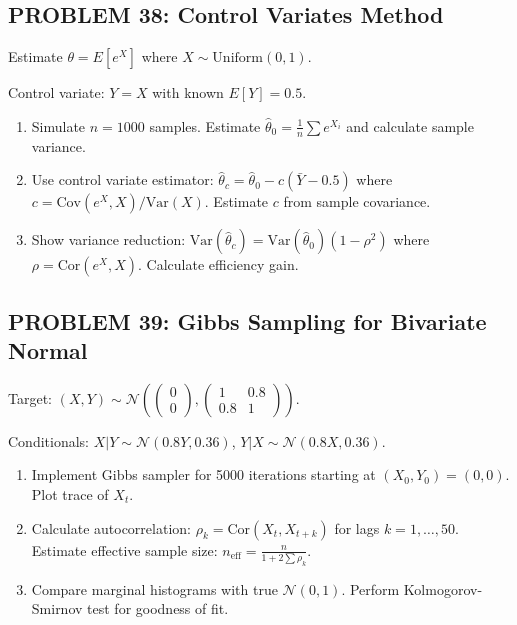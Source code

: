 \documentclass[12pt]{article}
\begin{document}
\subsection*{PROBLEM 38: Control Variates Method}

Estimate \(\theta = E[e^X]\) where \(X \sim \text{Uniform}(0,1)\).

Control variate: \(Y = X\) with known \(E[Y] = 0.5\).

\begin{enumerate}
\item[(a)] Simulate \(n=1000\) samples. Estimate \(\hat{\theta}_0 = \frac{1}{n}\sum e^{X_i}\) and calculate sample variance.
\item[(b)] Use control variate estimator: \(\hat{\theta}_c = \hat{\theta}_0 - c(\bar{Y} - 0.5)\) where \(c = \text{Cov}(e^X, X)/\text{Var}(X)\). Estimate \(c\) from sample covariance.
\item[(c)] Show variance reduction: \(\text{Var}(\hat{\theta}_c) = \text{Var}(\hat{\theta}_0)(1 - \rho^2)\) where \(\rho = \text{Cor}(e^X, X)\). Calculate efficiency gain.
\end{enumerate}

\subsection*{PROBLEM 39: Gibbs Sampling for Bivariate Normal}

Target: \((X,Y) \sim \mathcal{N}\left(\begin{pmatrix}0\\0\end{pmatrix}, \begin{pmatrix}1 & 0.8\\0.8 & 1\end{pmatrix}\right)\).

Conditionals: \(X|Y \sim \mathcal{N}(0.8Y, 0.36)\), \(Y|X \sim \mathcal{N}(0.8X, 0.36)\).

\begin{enumerate}
\item[(a)] Implement Gibbs sampler for 5000 iterations starting at \((X_0, Y_0) = (0, 0)\). Plot trace of \(X_t\).
\item[(b)] Calculate autocorrelation: \(\rho_k = \text{Cor}(X_t, X_{t+k})\) for lags \(k=1,\ldots,50\). Estimate effective sample size: \(n_{\text{eff}} = \frac{n}{1+2\sum \rho_k}\).
\item[(c)] Compare marginal histograms with true \(\mathcal{N}(0,1)\). Perform Kolmogorov-Smirnov test for goodness of fit.
\end{enumerate}
\end{document}
